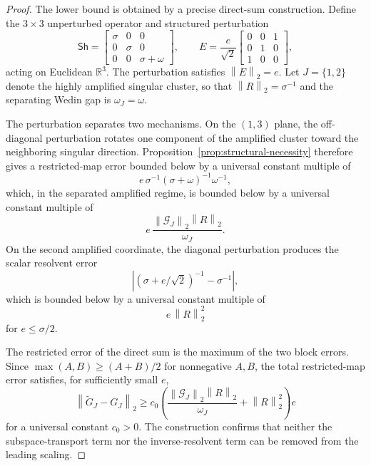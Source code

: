 \documentclass[review]{siamart220329}
\theoremstyle{definition}
\theoremstyle{remark}
\newcommand{\R}{\mathbb{R}}
\newcommand{\Sh}{\mathsf{Sh}}
\newcommand{\norm}[1]{\left\lVert #1\right\rVert}
\begin{document}
\begin{proof}
The lower bound is obtained by a precise direct-sum construction. Define the
$3\times3$ unperturbed operator and structured perturbation
\begin{equation}
    \Sh=
    \begin{bmatrix}
    \sigma & 0 & 0\\
    0 & \sigma & 0\\
    0 & 0 & \sigma+\omega
    \end{bmatrix},
    \qquad
    E=\frac{e}{\sqrt{2}}
    \begin{bmatrix}
    0 & 0 & 1\\
    0 & 1 & 0\\
    1 & 0 & 0
    \end{bmatrix},
\end{equation}
acting on Euclidean $\R^3$. The perturbation satisfies $\norm{E}_2=e$.
Let $J=\{1,2\}$ denote the highly amplified singular cluster, so that
$\norm{R}_2=\sigma^{-1}$ and the separating Wedin gap is
$\omega_J=\omega$.

The perturbation separates two mechanisms. On the $(1,3)$ plane, the
off-diagonal perturbation rotates one component of the amplified cluster toward
the neighboring singular direction. Proposition~\ref{prop:structural-necessity}
therefore gives a restricted-map error bounded below by a universal constant
multiple of
\begin{equation}
    e\,\sigma^{-1}(\sigma+\omega)^{-1}\omega^{-1},
\end{equation}
which, in the separated amplified regime, is bounded below by a universal
constant multiple of
\[
    e\,\frac{\norm{\mathcal G_J}_2\norm{R}_2}{\omega_J}.
\]
On the second amplified coordinate, the diagonal perturbation produces the
scalar resolvent error
\begin{equation}
    \left|(\sigma+e/\sqrt{2})^{-1}-\sigma^{-1}\right|,
\end{equation}
which is bounded below by a universal constant multiple of
\[
    e\,\norm{R}_2^2
\]
for $e\le \sigma/2$.

The restricted error of the direct sum is the maximum of the two block errors.
Since $\max(A,B)\ge (A+B)/2$ for nonnegative $A,B$, the total restricted-map
error satisfies, for sufficiently small $e$,
\begin{equation}
    \norm{\widetilde G_J-G_J}_2
    \ge
    c_0
    \left(
    \frac{\norm{\mathcal G_J}_2\norm{R}_2}{\omega_J}
    +
    \norm{R}_2^2
    \right)e
\end{equation}
for a universal constant $c_0>0$. The construction confirms that neither the
subspace-transport term nor the inverse-resolvent term can be removed from the
leading scaling.
\end{proof}
\end{document}
